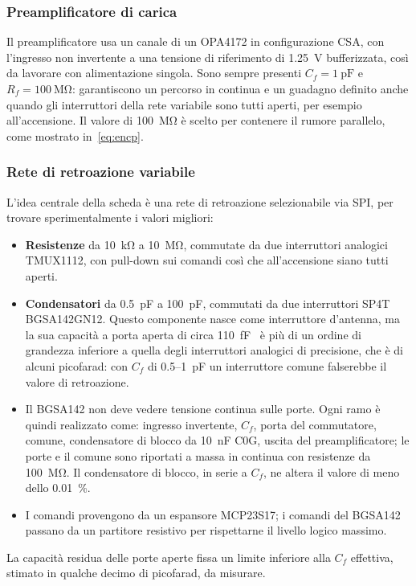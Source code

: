 \documentclass[11pt,a4paper]{article}
\begin{document}
\subsubsection{Preamplificatore di carica}

Il preamplificatore usa un canale di un OPA4172 in configurazione CSA, con l'ingresso non invertente a una tensione di riferimento di \SI{1.25}{\volt} bufferizzata, così da lavorare con alimentazione singola. Sono sempre presenti $C_f = \SI{1}{\pico\farad}$ e $R_f = \SI{100}{\mega\ohm}$: garantiscono un percorso in continua e un guadagno definito anche quando gli interruttori della rete variabile sono tutti aperti, per esempio all'accensione. Il valore di \SI{100}{\mega\ohm} è scelto per contenere il rumore parallelo, come mostrato in~\eqref{eq:encp}.

\subsubsection{Rete di retroazione variabile}

L'idea centrale della scheda è una rete di retroazione selezionabile via SPI, per trovare sperimentalmente i valori migliori:
\begin{itemize}
  \item \textbf{Resistenze} da \SI{10}{\kilo\ohm} a \SI{10}{\mega\ohm}, commutate da due interruttori analogici TMUX1112, con pull-down sui comandi così che all'accensione siano tutti aperti.
  \item \textbf{Condensatori} da \SI{0.5}{\pico\farad} a \SI{100}{\pico\farad}, commutati da due interruttori SP4T BGSA142GN12. Questo componente nasce come interruttore d'antenna, ma la sua capacità a porta aperta di circa \SI{110}{\femto\farad}~\cite{bgsa142} è più di un ordine di grandezza inferiore a quella degli interruttori analogici di precisione, che è di alcuni picofarad: con $C_f$ di \SI{0.5}{}--\SI{1}{\pico\farad} un interruttore comune falserebbe il valore di retroazione.
  \item Il BGSA142 non deve vedere tensione continua sulle porte. Ogni ramo è quindi realizzato come: ingresso invertente, $C_f$, porta del commutatore, comune, condensatore di blocco da \SI{10}{\nano\farad} C0G, uscita del preamplificatore; le porte e il comune sono riportati a massa in continua con resistenze da \SI{100}{\mega\ohm}. Il condensatore di blocco, in serie a $C_f$, ne altera il valore di meno dello \SI{0.01}{\percent}.
  \item I comandi provengono da un espansore MCP23S17; i comandi del BGSA142 passano da un partitore resistivo per rispettarne il livello logico massimo.
\end{itemize}
La capacità residua delle porte aperte fissa un limite inferiore alla $C_f$ effettiva, stimato in qualche decimo di picofarad, da misurare.
\end{document}
